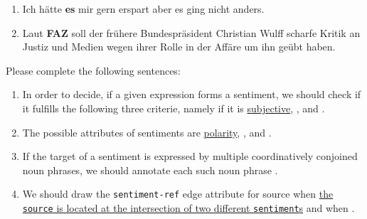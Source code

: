 \documentclass[12pt,fleqn]{scrreprt}
\begin{document}
\begin{enumerate}[I)]
\begin{enumerate}
  \item Ich h\"atte \textbf{es} mir gern erspart aber es ging nicht anders.

  \item Laut \textbf{FAZ} soll der fr\"uhere Bundespr\"asident Christian Wulff
    scharfe Kritik an Justiz und Medien wegen ihrer Rolle in der Aff\"are
    um ihn ge\"ubt haben.
  \end{enumerate}

  {\bfseries\item Please complete the following sentences:}
  \begin{enumerate}
  \item In order to decide, if a given expression forms a sentiment,
    we should check if it fulfills the following three criterie,
    namely if it is \underline{subjective}, \underline{\hspace{4cm}},
    and \underline{\hspace{4cm}}.

  \item The possible attributes of sentiments are
    \underline{polarity}, \underline{\hspace{4cm}}, and
    \underline{\hspace{4cm}}.

  \item If the target of a sentiment is expressed by multiple
    coordinatively conjoined noun phrases, we should annotate each
    such noun phrase \underline{\hspace{4cm}}.

  \item We should draw the \texttt{sentiment-ref} edge attribute for
    source when \underline{the \texttt{source} is located at
      the intersection of two different \texttt{sentiment}s} and
    when \underline{\hspace{8cm}}.


\end{enumerate}
\end{enumerate}
\end{document}
